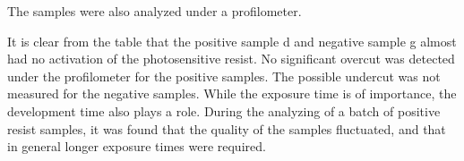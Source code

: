 The samples were also analyzed under a profilometer.

%



It is clear from the table that the positive sample d and negative sample g almost had no activation of the photosensitive resist. No significant overcut was detected under the profilometer for the positive samples. The possible undercut was not measured for the negative samples.
While the exposure time is of importance, the development time also plays a role. During the analyzing of a batch of positive resist samples, it was found that the quality of the samples fluctuated, and that in general longer exposure times were required. 
